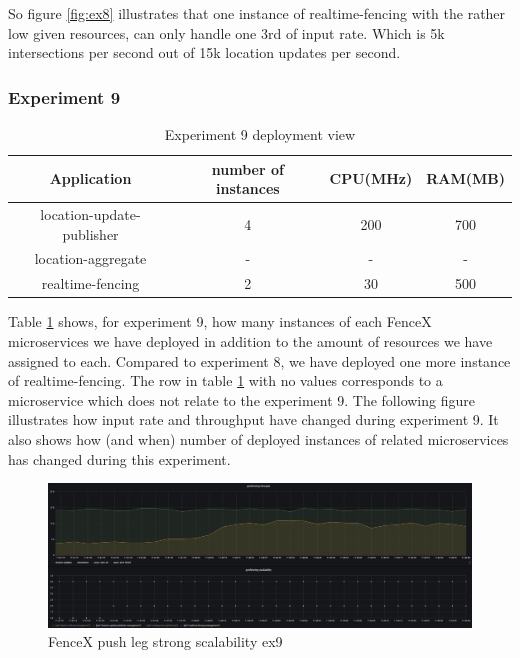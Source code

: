 \documentclass[a4]{report}
\begin{document}
    So figure \ref{fig:ex8} illustrates that one instance of realtime-fencing with the rather low given resources, can
    only handle one 3rd of input rate.
    Which is 5k intersections per second out of 15k location updates per second.

    \subsubsection{Experiment 9}
    \begin{table}[h!]
        \centering
        \begin{tabular}{|c|c|c|c|}
            \hline
            Application               & number of instances & CPU(MHz) & RAM(MB) \\
            \hline
            location-update-publisher & 4                   & 200      & 700     \\
            location-aggregate        & -                   & -        & -       \\
            realtime-fencing          & 2                   & 30       & 500     \\
            \hline
        \end{tabular}
        \caption{Experiment 9 deployment view}
        \label{table:ex9-dv}
    \end{table}

    Table \ref{table:ex9-dv} shows, for experiment 9, how many instances of each FenceX microservices we have
    deployed in addition to the amount of resources we have assigned to each.
    Compared to experiment 8, we have deployed one more instance of realtime-fencing.
    The row in table \ref{table:ex9-dv} with no values corresponds to a microservice which does not relate to the
    experiment 9.
    The following figure illustrates how input rate and throughput have changed during experiment 9.
    It also shows how (and when) number of deployed instances of related microservices has changed during this
    experiment.

    \begin{figure}
        \caption{FenceX push leg strong scalability ex9}
        \label{fig:ex9}
        \includegraphics[scale=0.5]{images/evaluation/ex9-benchmarking-ongoing-2per4sec.png}
    \end{figure}
\end{document}
